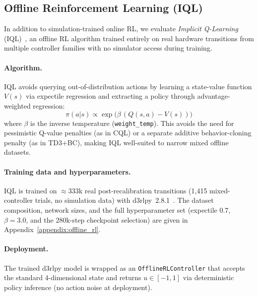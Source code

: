 \subsection{Offline Reinforcement Learning (IQL)}
\label{sec:iql_impl}

In addition to simulation-trained online RL, we evaluate
\emph{Implicit Q-Learning} (IQL)~\cite{kostrikov2022iql},
an offline RL algorithm trained entirely on real hardware
transitions from multiple controller families with no simulator access
during training.

\paragraph{Algorithm.}
IQL avoids querying out-of-distribution actions by learning a
state-value function $V(s)$ via expectile regression and
extracting a policy through advantage-weighted regression:
\begin{equation}
  \pi(a|s) \propto \exp\!\bigl(\beta\,(Q(s,a) - V(s))\bigr)
  \label{eq:iql_policy}
\end{equation}
where $\beta$ is the inverse temperature (\texttt{weight\_temp}).
This avoids the need for pessimistic Q-value penalties (as in CQL)
or a separate additive behavior-cloning penalty (as in TD3+BC), making IQL
well-suited to narrow mixed offline datasets.

\paragraph{Training data and hyperparameters.}
IQL is trained on $\approx$333k real post-recalibration transitions
(1{,}415 mixed-controller trials, no simulation data) with
d3rlpy~2.8.1~\cite{seno2022d3rlpy}. The dataset composition, network
sizes, and the full hyperparameter set (expectile 0.7,
$\beta = 3.0$, and the 280k-step checkpoint selection) are given in
Appendix~\ref{appendix:offline_rl}.

\paragraph{Deployment.}
The trained d3rlpy model is wrapped as an
\texttt{OfflineRLController} that accepts the standard
4-dimensional state and returns $u \in [-1,1]$ via deterministic
policy inference (no action noise at deployment).
